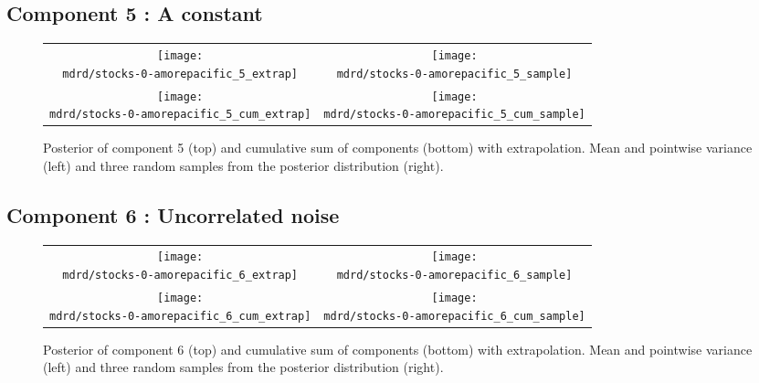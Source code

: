\documentclass{article} %
\begin{document}
\subsection{Component 5 : A constant}



\begin{figure}[H]
\newcommand{\wmgd}{0.5\columnwidth}
\newcommand{\hmgd}{3.0cm}
\newcommand{\mdrd}{stocks-0-amorepacific}
\newcommand{\mbm}{\hspace{-0.3cm}}
\begin{tabular}{cc}
\mbm \texttt{[image: \\mdrd/stocks-0-amorepacific\_5\_extrap]} & \texttt{[image: \\mdrd/stocks-0-amorepacific\_5\_sample]} \\
\mbm \texttt{[image: \\mdrd/stocks-0-amorepacific\_5\_cum\_extrap]} & \texttt{[image: \\mdrd/stocks-0-amorepacific\_5\_cum\_sample]}
\end{tabular}
\caption{Posterior of component 5 (top) and cumulative sum of components (bottom) with extrapolation. Mean and pointwise variance (left) and three random samples from the posterior distribution (right).}
\label{fig:extrap5}
\end{figure}

\subsection{Component 6 : Uncorrelated noise}



\begin{figure}[H]
\newcommand{\wmgd}{0.5\columnwidth}
\newcommand{\hmgd}{3.0cm}
\newcommand{\mdrd}{stocks-0-amorepacific}
\newcommand{\mbm}{\hspace{-0.3cm}}
\begin{tabular}{cc}
\mbm \texttt{[image: \\mdrd/stocks-0-amorepacific\_6\_extrap]} & \texttt{[image: \\mdrd/stocks-0-amorepacific\_6\_sample]} \\
\mbm \texttt{[image: \\mdrd/stocks-0-amorepacific\_6\_cum\_extrap]} & \texttt{[image: \\mdrd/stocks-0-amorepacific\_6\_cum\_sample]}
\end{tabular}
\caption{Posterior of component 6 (top) and cumulative sum of components (bottom) with extrapolation. Mean and pointwise variance (left) and three random samples from the posterior distribution (right).}
\label{fig:extrap6}
\end{figure}
\end{document}
